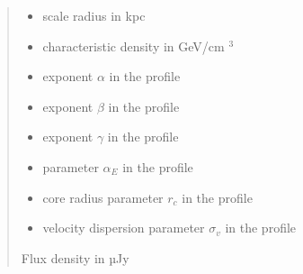 \documentclass[letterpaper,10pt,english]{sphinxmanual}
\begin{document}
\begin{fulllineitems}
\begin{itemize}
\end{itemize}
\begin{quote}\begin{description}
\begin{itemize}
\item {} 
\sphinxAtStartPar
{} \textendash{} scale radius in kpc

\item {} 
\sphinxAtStartPar
{} \textendash{} characteristic density in GeV/cm \({}^3\)

\item {} 
\sphinxAtStartPar
{} \textendash{} exponent \(\alpha\) in the {\hyperref[\detokenize{diffsph.profiles:diffsph.profiles.templates.hdz}]{}} profile

\item {} 
\sphinxAtStartPar
{} \textendash{} exponent \(\beta\) in the {\hyperref[\detokenize{diffsph.profiles:diffsph.profiles.templates.hdz}]{}} profile

\item {} 
\sphinxAtStartPar
{} \textendash{} exponent \(\gamma\) in the {\hyperref[\detokenize{diffsph.profiles:diffsph.profiles.templates.hdz}]{}} profile

\item {} 
\sphinxAtStartPar
{} \textendash{} parameter \(\alpha_E\) in the {\hyperref[\detokenize{diffsph.profiles:diffsph.profiles.templates.enst}]{}} profile

\item {} 
\sphinxAtStartPar
{} \textendash{} core radius parameter \(r_c\) in the {\hyperref[\detokenize{diffsph.profiles:diffsph.profiles.templates.cnfw}]{}} profile

\item {} 
\sphinxAtStartPar
{} \textendash{} velocity dispersion parameter \(\sigma_v\) in the {\hyperref[\detokenize{diffsph.profiles:diffsph.profiles.templates.sis}]{}} profile

\end{itemize}

\sphinxAtStartPar
Flux density in µJy

\end{description}\end{quote}

\end{fulllineitems}
\end{document}
